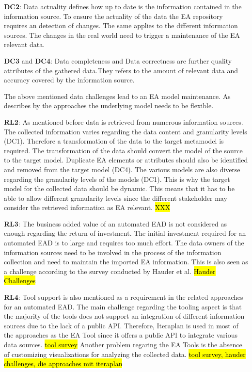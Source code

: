 \textbf{DC2}: Data actuality defines how up to date is the information contained in the information source. To ensure the actuality of the data the EA repository requires an detection of changes. The same applies to the different information sources. The changes in the real world need to trigger a maintenance of the EA relevant data.

\textbf{DC3} and \textbf{DC4}: Data completeness and Data correctness are further quality attributes of the gathered data.They refers to the amount of relevant data  and accuracy covered by the information source.

The above mentioned data challenges lead to an EA model maintenance. As describes by the approaches the underlying model needs to be flexible.

\textbf{RL2}: As mentioned before data is retrieved from numerous information sources. The collected information varies regarding the data content and granularity levels (DC1). Therefore a transformation of the data to the target metamodel is required. 
The transformation of the data should convert the model of the source to the target model. Duplicate EA elements or attributes should also be identified and removed from the target model (DC4). The various models are also diverse regarding the granularity levels of the models (DC1). This is why the target model for the collected data should be dynamic. This means that it has to be able to allow different granularity levels since the different stakeholder may consider the retrieved information as EA relevant. \hl{XXX}

\textbf{RL3}: The business added value of an automated EAD is not considered as enough regarding the return of investment. The initial investment required for an automated EAD is to large and requires too much effort. The data owners of the information sources need to be involved in the process of the information collection and need to maintain the imported EA information. This is also seen as a challenge according to the survey conducted by Hauder et al. \hl{Hauder Challenges}

\textbf{RL4}: Tool support is also mentioned as a requirement in the related approaches for an automated EAD. The main challenge regarding the tooling aspect is that the majority of the tools does not support an integration of different information sources due to the lack of a public API. Therefore, Iteraplan is used in most of the approaches as the EA Tool since it offers a public API to integrate various data sources. \hl{tool survey} Another problem regaring the EA Tools is the absence of customizing visualizations for analyzing the collected data. \hl{tool survey, hauder challenges, die approaches mit iteraplan} 

